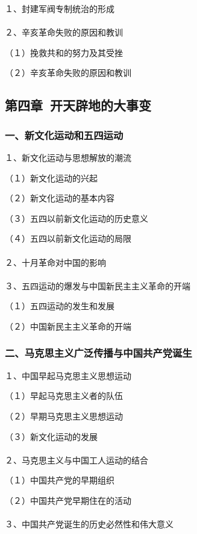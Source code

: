\documentclass{ctexart}
\begin{document}
１、封建军阀专制统治的形成
\\\\

２、辛亥革命失败的原因和教训

（１）挽救共和的努力及其受挫

（２）辛亥革命失败的原因和教训


\subsection{第四章\ 开天辟地的大事变}

\subsubsection{一、新文化运动和五四运动}
１、新文化运动与思想解放的潮流

（１）新文化运动的兴起

（２）新文化运动的基本内容

（３）五四以前新文化运动的历史意义

（４）五四以前新文化运动的局限
\\\\

２、十月革命对中国的影响
\\\\

３、五四运动的爆发与中国新民主主义革命的开端

（１）五四运动的发生和发展

（２）中国新民主主义革命的开端

\subsubsection{二、马克思主义广泛传播与中国共产党诞生}

１、中国早起马克思主义思想运动

（１）早起马克思主义者的队伍

（２）早期马克思主义思想运动

（３）新文化运动的发展
\\\\

２、马克思主义与中国工人运动的结合

（１）中国共产党的早期组织

（２）中国共产党早期住在的活动
\\\\

３、中国共产党诞生的历史必然性和伟大意义
\end{document}
